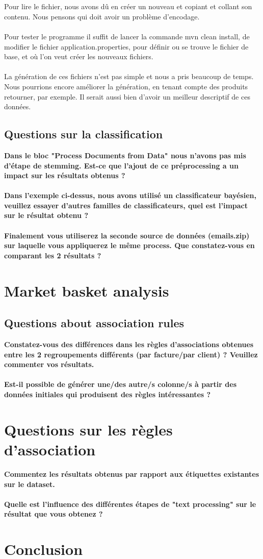 \documentclass[a4paper]{article}
\begin{document}
\\\\
Pour lire le fichier, nous avons dû en créer un nouveau et copiant et collant son contenu. Nous pensons qui doit avoir un problème d’encodage. 
\\\\
Pour tester le programme il suffit de lancer la commande mvn clean install, de modifier le fichier application.properties, pour définir ou se trouve le fichier de base, et où l'on veut créer les nouveaux fichiers.
\\\\
La génération de ces fichiers n’est pas simple et nous a pris beaucoup de temps. Nous pourrions encore améliorer la génération, en tenant compte des produits retourner, par exemple. Il serait aussi bien d’avoir un meilleur descriptif de ces données.   

\subsection{Questions sur la classification}

\textbf{Dans le bloc "Process Documents from Data" nous n’avons pas mis d’étape de stemming. Est-ce que l'ajout de ce préprocessing a un impact sur les résultats obtenus ?}
\\\\
\textbf{Dans l’exemple ci-dessus, nous avons utilisé un classificateur bayésien, veuillez essayer d’autres familles de classificateurs, quel est l’impact sur le résultat obtenu ?}
\\\\
\textbf{Finalement vous utiliserez la seconde source de données (emails.zip) sur laquelle vous appliquerez le même process. Que constatez-vous en comparant les 2 résultats ?}


\section{Market basket analysis}
\subsection{Questions about association rules}
\textbf{Constatez-vous des différences dans les règles d’associations obtenues entre les 2 regroupements différents (par facture/par client) ? Veuillez commenter vos résultats.}
\\\\
\textbf{Est-il possible de générer une/des autre/s colonne/s à partir des données initiales qui produisent des règles intéressantes ?}

\section{Questions sur les règles d’association}

\textbf{Commentez les résultats obtenus par rapport aux étiquettes existantes sur le dataset.}
\\\\
\textbf{Quelle est l'influence des différentes étapes de "text processing" sur le résultat que vous obtenez ?}

\section{Conclusion}
\end{document}

